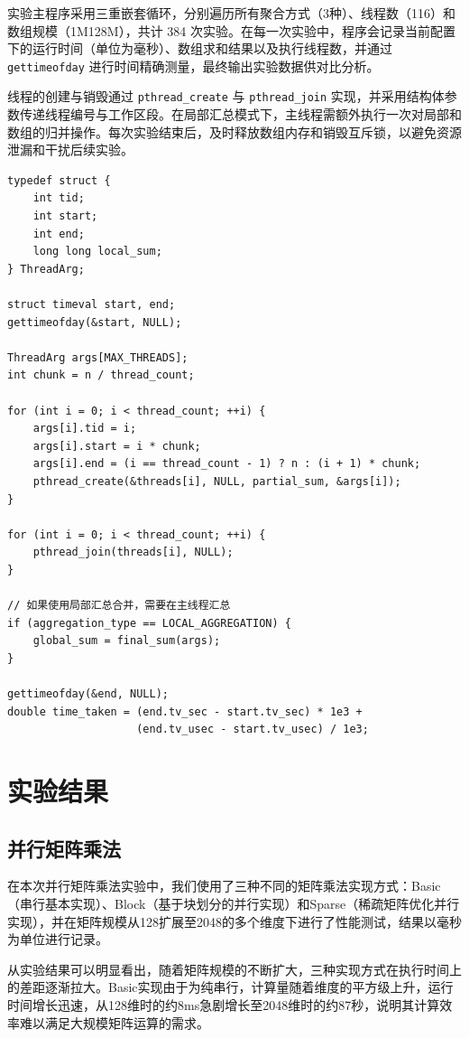 \documentclass[a4paper, utf8]{ctexart}
\begin{document}
	实验主程序采用三重嵌套循环，分别遍历所有聚合方式（3种）、线程数（116）和数组规模（1M128M），共计 384 次实验。在每一次实验中，程序会记录当前配置下的运行时间（单位为毫秒）、数组求和结果以及执行线程数，并通过 \verb|gettimeofday| 进行时间精确测量，最终输出实验数据供对比分析。
	
	线程的创建与销毁通过 \verb|pthread_create| 与 \verb|pthread_join| 实现，并采用结构体参数传递线程编号与工作区段。在局部汇总模式下，主线程需额外执行一次对局部和数组的归并操作。每次实验结束后，及时释放数组内存和销毁互斥锁，以避免资源泄漏和干扰后续实验。
	
	\begin{verbatim}
typedef struct {
    int tid;
    int start;
    int end;
    long long local_sum;
} ThreadArg;

struct timeval start, end;
gettimeofday(&start, NULL);

ThreadArg args[MAX_THREADS];
int chunk = n / thread_count;

for (int i = 0; i < thread_count; ++i) {
    args[i].tid = i;
    args[i].start = i * chunk;
    args[i].end = (i == thread_count - 1) ? n : (i + 1) * chunk;
    pthread_create(&threads[i], NULL, partial_sum, &args[i]);
}

for (int i = 0; i < thread_count; ++i) {
    pthread_join(threads[i], NULL);
}

// 如果使用局部汇总合并，需要在主线程汇总
if (aggregation_type == LOCAL_AGGREGATION) {
    global_sum = final_sum(args);
}

gettimeofday(&end, NULL);
double time_taken = (end.tv_sec - start.tv_sec) * 1e3 +
                    (end.tv_usec - start.tv_usec) / 1e3;
	\end{verbatim}
	
	\section{实验结果}
	
	\subsection{并行矩阵乘法}
	
	在本次并行矩阵乘法实验中，我们使用了三种不同的矩阵乘法实现方式：Basic（串行基本实现）、Block（基于块划分的并行实现）和Sparse（稀疏矩阵优化并行实现），并在矩阵规模从128扩展至2048的多个维度下进行了性能测试，结果以毫秒为单位进行记录。
	
	从实验结果可以明显看出，随着矩阵规模的不断扩大，三种实现方式在执行时间上的差距逐渐拉大。Basic实现由于为纯串行，计算量随着维度的平方级上升，运行时间增长迅速，从128维时的约8ms急剧增长至2048维时的约87秒，说明其计算效率难以满足大规模矩阵运算的需求。
	
\end{document}
